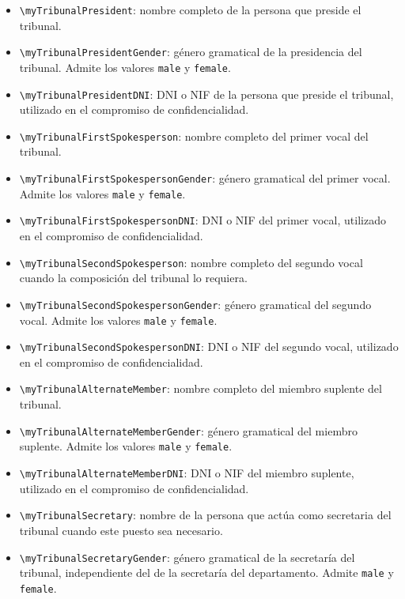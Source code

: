 \begin{itemize}
  \item \texttt{\textbackslash{}myTribunalPresident}: nombre completo de la persona que preside el tribunal.
  \item \texttt{\textbackslash{}myTribunalPresidentGender}: género gramatical de la presidencia del tribunal. Admite los valores \texttt{male} y \texttt{female}.
  \item \texttt{\textbackslash{}myTribunalPresidentDNI}: DNI o NIF de la persona que preside el tribunal, utilizado en el compromiso de confidencialidad.
  \item \texttt{\textbackslash{}myTribunalFirstSpokesperson}: nombre completo del primer vocal del tribunal.
  \item \texttt{\textbackslash{}myTribunalFirstSpokespersonGender}: género gramatical del primer vocal. Admite los valores \texttt{male} y \texttt{female}.
  \item \texttt{\textbackslash{}myTribunalFirstSpokespersonDNI}: DNI o NIF del primer vocal, utilizado en el compromiso de confidencialidad.
  \item \texttt{\textbackslash{}myTribunalSecondSpokesperson}: nombre completo del segundo vocal cuando la composición del tribunal lo requiera.
  \item \texttt{\textbackslash{}myTribunalSecondSpokespersonGender}: género gramatical del segundo vocal. Admite los valores \texttt{male} y \texttt{female}.
  \item \texttt{\textbackslash{}myTribunalSecondSpokespersonDNI}: DNI o NIF del segundo vocal, utilizado en el compromiso de confidencialidad.
  \item \texttt{\textbackslash{}myTribunalAlternateMember}: nombre completo del miembro suplente del tribunal.
  \item \texttt{\textbackslash{}myTribunalAlternateMemberGender}: género gramatical del miembro suplente. Admite los valores \texttt{male} y \texttt{female}.
  \item \texttt{\textbackslash{}myTribunalAlternateMemberDNI}: DNI o NIF del miembro suplente, utilizado en el compromiso de confidencialidad.
  \item \texttt{\textbackslash{}myTribunalSecretary}: nombre de la persona que actúa como secretaria del tribunal cuando este puesto sea necesario.
  \item \texttt{\textbackslash{}myTribunalSecretaryGender}: género gramatical de la secretaría del tribunal, independiente del de la secretaría del departamento. Admite \texttt{male} y \texttt{female}.
\end{itemize}

